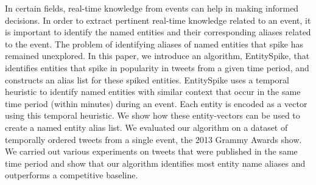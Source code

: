 In certain fields, real-time knowledge from events can help in making informed decisions. In order to extract pertinent real-time knowledge related to an event, it is important to identify the named entities and their corresponding aliases related to the event. The problem of identifying aliases of named entities that spike has remained unexplored. In this paper, we introduce an algorithm, EntitySpike, that identifies entities that spike in popularity in tweets from a given time period, and constructs an alias list for these spiked entities. EntitySpike uses a temporal heuristic to identify named entities with similar context that occur in the same time period (within minutes) during an event. Each entity is encoded as a vector using this temporal heuristic. We show how these entity-vectors can be used to create a named entity alias list. We evaluated our algorithm on a dataset of temporally ordered tweets from a single event, the 2013 Grammy Awards show. We carried out various experiments on tweets that were published in the same time period and show that our algorithm identifies most entity name aliases and outperforms a competitive baseline.
